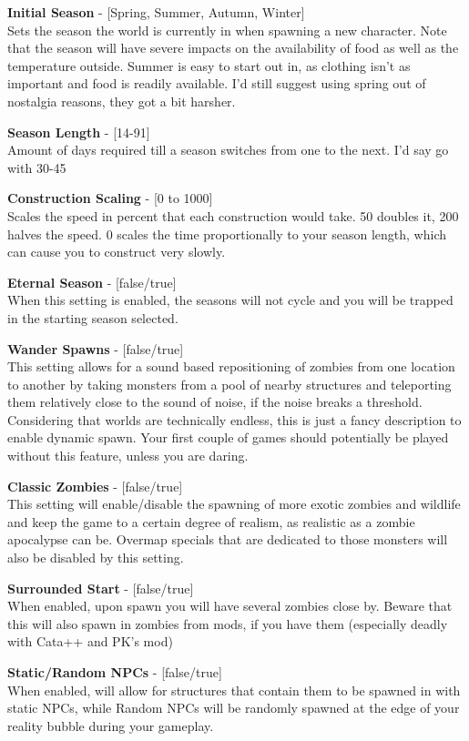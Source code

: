 \textbf{Initial Season} - [Spring, Summer, Autumn, Winter]\\Sets the season the world is currently in when spawning a new character. Note that the season will have severe impacts on the availability of food as well as the temperature outside. Summer is easy to start out in, as clothing isn't as important and food is readily available. I'd still suggest using spring out of nostalgia reasons, they got a bit harsher.

\textbf{Season Length} - [14-91]\\Amount of days required till a season switches from one to the next. I'd say go with 30-45

\textbf{Construction Scaling} - [0 to 1000]\\Scales the speed in percent that each construction would take. 50 doubles it, 200 halves the speed. 0 scales the time proportionally to your season length, which can cause you to construct very slowly.

\textbf{Eternal Season} - [false/true]\\When this setting is enabled, the seasons will not cycle and you will be trapped in the starting season selected.

\textbf{Wander Spawns} - [false/true]\\This setting allows for a sound based repositioning of zombies from one location to another by taking monsters from a pool of nearby structures and teleporting them relatively close to the sound of noise, if the noise breaks a threshold. Considering that worlds are technically endless, this is just a fancy description to enable dynamic spawn. Your first couple of games should potentially be played without this feature, unless you are daring.

\textbf{Classic Zombies} - [false/true]\\This setting will enable/disable the spawning of more exotic zombies and wildlife and keep the game to a certain degree of realism, as realistic as a zombie apocalypse can be. Overmap specials that are dedicated to those monsters will also be disabled by this setting.

\textbf{Surrounded Start} - [false/true]\\When enabled, upon spawn you will have several zombies close by. Beware that this will also spawn in zombies from mods, if you have them (especially deadly with Cata++ and PK's mod)

\textbf{Static/Random NPCs} - [false/true]\\When enabled, will allow for structures that contain them to be spawned in with static NPCs, while Random NPCs will be randomly spawned at the edge of your reality bubble during your gameplay.

